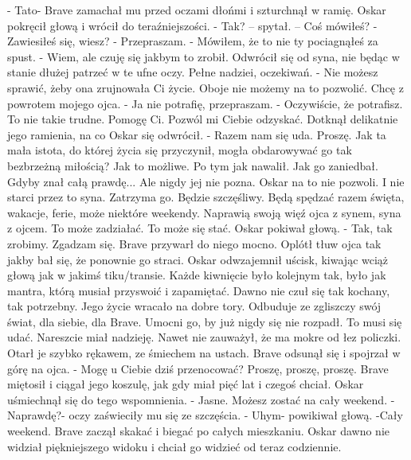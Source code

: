 \documentclass[12pt,a4paper]{book}
\begin{document}
- Tato- Brave zamachał mu przed oczami dłońmi i szturchnął w ramię.
Oskar pokręcił głową i wrócił do teraźniejszości. 
- Tak? – spytał. – Coś mówiłeś?
- Zawiesiłeś się, wiesz?
- Przepraszam. 
- Mówiłem, że to nie ty pociagnąłeś za spust. 
- Wiem, ale czuję się jakbym to zrobił. 
Odwrócił się od syna, nie będąc w stanie dłużej patrzeć w te ufne oczy. Pełne nadziei, oczekiwań.
- Nie możesz sprawić, żeby ona zrujnowała Ci życie. Oboje nie możemy na to pozwolić. Chcę z powrotem mojego ojca. 
- Ja nie potrafię, przepraszam. 
- Oczywiście, że potrafisz. To nie takie trudne. Pomogę Ci. Pozwól mi Ciebie odzyskać. 
Dotknął delikatnie jego ramienia, na co Oskar się odwrócił. 
- Razem nam się uda. Proszę. 
Jak ta mała istota, do której życia się przyczynił, mogła obdarowywać go tak bezbrzeżną miłością? Jak to możliwe. Po tym jak nawalił. Jak go zaniedbał. Gdyby znał całą prawdę... Ale nigdy jej nie pozna. Oskar na to nie pozwoli. I nie starci przez to syna. Zatrzyma go. Będzie szczęśliwy. Będą spędzać razem święta, wakacje, ferie, może niektóre weekendy. Naprawią swoją więź ojca z synem, syna z ojcem. To może zadziałać. To może się stać. 
Oskar pokiwał głową. 
- Tak, tak zrobimy. Zgadzam się. 
Brave przywarł do niego mocno. Oplótł tłuw ojca tak jakby bał się, że ponownie go straci. Oskar odwzajemnił uścisk, kiwając wciąż głową jak w jakimś tiku/transie. Każde kiwnięcie było kolejnym tak, było jak mantra, którą musiał przyswoić i zapamiętać. 
Dawno nie czuł się tak kochany, tak potrzebny. Jego życie wracało na dobre tory. Odbuduje ze zgliszczy swój świat, dla siebie, dla Brave. Umocni go, by już nigdy się nie rozpadł. To musi się udać. Nareszcie miał nadzieję. Nawet nie zauważył, że ma mokre od łez policzki. Otarł je szybko rękawem, ze śmiechem na ustach. 
Brave odsunął się i spojrzał w górę na ojca. 
- Mogę u Ciebie dziś przenocować? Proszę, proszę, proszę. 
Brave miętosił i ciągał  jego koszulę, jak gdy miał pięć lat i czegoś chciał. Oskar uśmiechnął się do tego wspomnienia. 
- Jasne. Możesz zostać na cały weekend.
- Naprawdę?- oczy zaświeciły mu się ze szczęścia. 
- Uhym- powikiwał głową. -Cały weekend. 
Brave zaczął skakać i biegać po całych mieszkaniu. Oskar dawno nie widział piękniejszego widoku i chciał go widzieć od teraz codziennie. 
 
\end{document}
